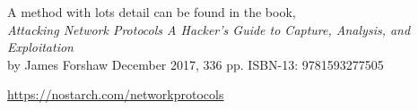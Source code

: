\documentclass[Screen16to9,17pt]{foils}
\begin{document}


\begin{list2}
\item
\item
\item
\item
\end{list2}


\begin{list2}
\item
\item
\item
\item
\end{list2}


\slide{}

\begin{list2}
\item
\item
\item
\item
\end{list2}




\slide{}

\begin{list2}
\item
\item
\item
\item
\end{list2}




\slide{}

\begin{list2}
\item
\item
\item
\item
\end{list2}





A method with lots detail can be found in the book,\\
\emph{Attacking Network Protocols A Hacker's Guide to Capture, Analysis, and Exploitation}\\
by James Forshaw December 2017, 336 pp. ISBN-13: 9781593277505

\url{https://nostarch.com/networkprotocols}




\end{document}
